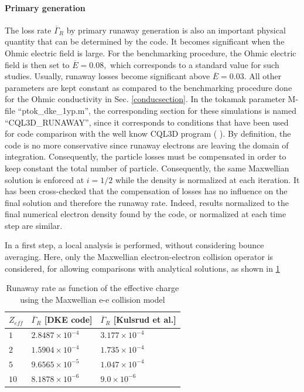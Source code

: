 
\label{runawaysection}
\paragraph{Primary generation}

The loss rate $\overline{\Gamma }_{R}$ by primary runaway generation is also
an important physical quantity that can be determined by the code. It
becomes significant when the Ohmic electric field is large. For the
benchmarking procedure, the Ohmic electric field is then set to $\overline{E}%
=0.08,$ which corresponds to a standard value for such studies. Usually,
runaway losses become significant above $\overline{E}=0.03.$ All other
parameters are kept constant as compared to the benchmarking procedure done
for the Ohmic conductivity in Sec. \ref{conducsection}. In the tokamak
parameter M-file ``ptok\_dke\_1yp.m'', the corresponding section for these
simulations is named ``CQL3D\_RUNAWAY'', since it corresponds to conditions
that have been used for code comparison with the well know CQL3D program (%
\cite{har93c1_IAEA}). By definition, the code is no more conservative since
runaway electrons are leaving the domain of integration. Consequently, the
particle losses must be compensated in order to keep constant the total
number of particle. Consequently, the same Maxwellian solution is enforced
at $i=1/2$ while the density is normalized at each iteration. It has been
cross-checked that the compensation of losses has no influence on the final
solution and therefore the runaway rate. Indeed, results normalized to the
final numerical electron density found by the code, or normalized at each
time step are similar.

In a first step, a local analysis is performed, without considering bounce
averaging. Here, only the Maxwellian electron-electron collision operator is
considered, for allowing comparisons with analytical solutions, as shown in
\ref{table_run1}

\begin{table}[tbp]
\begin{center}
\begin{tabular}{|l|l|l|}
\hline
$Z_{eff}$ & $\overline{\Gamma }_{R}$ [DKE code] & $\overline{\Gamma }_{R}$
[Kulsrud et al.] \\ \hline
$1$ & $2.8487\times 10^{-4}$ & $3.177\times 10^{-4}$ \\ \hline
$2$ & $1.5904\times 10^{-4}$ & $1.735\times 10^{-4}$ \\ \hline
$5$ & $9.6565\times 10^{-5}$ & $1.047\times 10^{-4}$ \\ \hline
$10$ & $8.1878\times 10^{-6}$ & $9.0\times 10^{-6}$ \\ \hline
\end{tabular}
\end{center}
\caption{Runaway rate as function of the effective charge using the
Maxwellian e-e collision model}
\label{table_run1}
\end{table}

